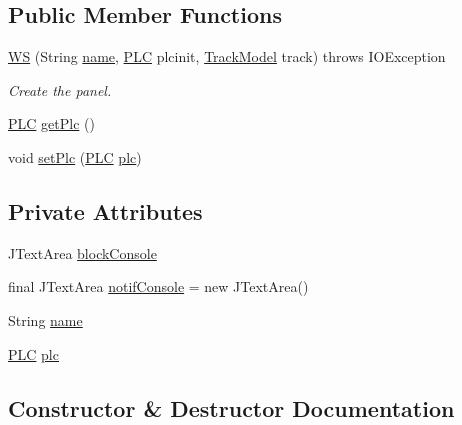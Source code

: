 \subsection*{Public Member Functions}
\begin{DoxyCompactItemize}
\item 
\hyperlink{classWaysideController_1_1WS_a2f8af7d88e4f63cfd49d4020744dc891}{WS} (String \hyperlink{classWaysideController_1_1WS_a73746fc2063e0ed9e50dbd475ba5d843}{name}, \hyperlink{classWaysideController_1_1PLC}{P\+LC} plcinit, \hyperlink{classTrackModel_1_1TrackModel}{Track\+Model} track)  throws I\+O\+Exception 
\begin{DoxyCompactList}\small\item\em Create the panel. \end{DoxyCompactList}\item 
\hyperlink{classWaysideController_1_1PLC}{P\+LC} \hyperlink{classWaysideController_1_1WS_a9672eb8c7582f4a60d37bba5427c547d}{get\+Plc} ()
\item 
void \hyperlink{classWaysideController_1_1WS_a51de417826432d895ca6f32295311f37}{set\+Plc} (\hyperlink{classWaysideController_1_1PLC}{P\+LC} \hyperlink{classWaysideController_1_1WS_a57f55ec27070bbfb629d38aafc9dc734}{plc})
\end{DoxyCompactItemize}
\subsection*{Private Attributes}
\begin{DoxyCompactItemize}
\item 
J\+Text\+Area \hyperlink{classWaysideController_1_1WS_a367fa310b4a1348d25c88b0081b1f34f}{block\+Console}
\item 
final J\+Text\+Area \hyperlink{classWaysideController_1_1WS_a33360f3852628ebd33644607c83f4ed4}{notif\+Console} = new J\+Text\+Area()
\item 
String \hyperlink{classWaysideController_1_1WS_a73746fc2063e0ed9e50dbd475ba5d843}{name}
\item 
\hyperlink{classWaysideController_1_1PLC}{P\+LC} \hyperlink{classWaysideController_1_1WS_a57f55ec27070bbfb629d38aafc9dc734}{plc}
\end{DoxyCompactItemize}


\subsection{Constructor \& Destructor Documentation}
\mbox{\label{classWaysideController_1_1WS_a2f8af7d88e4f63cfd49d4020744dc891}} 
